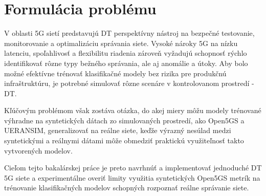 \section{Formulácia problému}
V oblasti 5G sietí predstavujú DT perspektívny nástroj na bezpečné testovanie, monitorovanie a optimalizáciu správania siete. Vysoké nároky 5G na nízku latenciu, spoľahlivosť a flexibilitu riadenia zároveň vyžadujú schopnosť rýchlo identifikovať rôzne typy bežného správania, ale aj anomálie a útoky. Aby bolo možné efektívne trénovať klasifikačné modely bez rizika pre produkčnú infraštruktúru, je potrebné simulovať rôzne scenáre v kontrolovanom prostredí - DT.

Kľúčovým problémom však zostáva otázka, do akej miery môžu modely trénované výhradne na syntetických dátach zo simulovaných prostredí, ako Open5GS a UERANSIM, generalizovať na reálne siete, keďže výrazný nesúlad medzi syntetickými a reálnymi dátami môže obmedziť praktickú využiteľnosť takto vytvorených modelov.

Cieľom tejto bakalárskej práce je preto navrhnúť a implementovať jednoduché DT 5G siete a experimentálne overiť limity využitia syntetických Open5GS metrík na trénovanie klasifikačných modelov schopných rozpoznať reálne správanie siete.